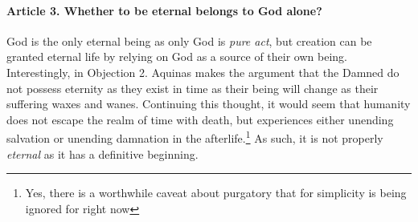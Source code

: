 \documentclass{ucetd}
\begin{document}
\paragraph{Article 3. Whether to be eternal belongs to God alone?}
God is the only eternal being as only God is \textit{pure act}, but creation can be granted eternal life by relying on God as a source of their own being. Interestingly, in Objection 2. Aquinas makes the argument that the Damned do not possess eternity as they exist in time as their being will change as their suffering waxes and wanes. Continuing this thought, it would seem that humanity does not escape the realm of time with death, but experiences either unending salvation or unending damnation in the afterlife.\footnote{Yes, there is a worthwhile caveat about purgatory that for simplicity is being ignored for right now} As such, it is not properly \textit{eternal} as it has a definitive beginning.
\end{document}

